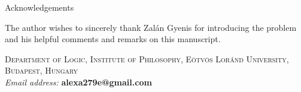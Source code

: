 \documentclass{article}
\begin{document}
	\begin{section}{Acknowledgements}
		
		The author wishes to sincerely thank Zalán Gyenis for introducing the problem and his helpful comments and remarks on this manuscript.	
		
	\end{section}
	
	
	
	
	
	
	
	
	
	
	
	
	
	
	
	
	
	
	\vspace{3 mm}
	
	\noindent \textsc{Department of Logic, Institute of Philosophy, Eötvös Loránd University, Budapest, Hungary}\\
	\textit{Email address:} \textbf{alexa279e@gmail.com}
	
	
	
	
	
\end{document}
